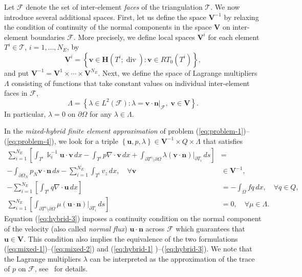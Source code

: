 Let $\mathcal{F}$ denote the set of inter-element \emph{faces} of the
triangulation $\mathcal{T}$. We now introduce several additional spaces.
First, let us define the space $\mathbf{V}^{-1}$ by relaxing the condition of
continuity of the normal components in the space $\mathbf{V}$ on inter-element
boundaries $\mathcal{F}$. More precisely, we define local spaces
$\mathbf{V}^{i}$ for each element $T^{i}\in\mathcal{T}$, $i=1,\ldots,N_{E}$,
by
\begin{equation}
\mathbf{V}^{i}=\left\{  \mathbf{v}\in\mathbf{H}(T^{i};\operatorname{div}%
):\mathbf{v}\in RT_{0}(T^{i})\right\}  ,
\end{equation}
and put $\mathbf{V}^{-1}=\mathbf{V}^{1}\times\cdots\times\mathbf{V}^{N_{E}}$.
Next, we define the space of Lagrange multipliers $\Lambda$ consisting of
functions that take constant values on individual inter-element faces in
$\mathcal{F}$,
\begin{equation}
\Lambda=\left\{  \lambda\in L^{2}\left(  \mathcal{F}\right)  :\lambda
=\mathbf{v}\cdot\mathbf{n}|_{\mathcal{F}},\;\mathbf{v\in V} \right\}.
\label{eq:lambda_space}
\end{equation}
In particular, $\lambda=0$ on $\partial\Omega$ for any $\lambda\in\Lambda$.


In the \emph{mixed-hybrid finite element approximation} of problem
(\ref{eq:problem-1})--(\ref{eq:problem-4}), we look for a triple $\left\{
\mathbf{u},p,\lambda\right\}  \in\mathbf{V}^{-1}\times Q\times\Lambda$ that
satisfies
\begin{align}
\sum_{i=1}^{N_{E}}\left[  \int_{T^{i}}\Bbbk_{i}^{-1}\mathbf{u}\cdot
\mathbf{v}\,dx-\int_{T^{i}}p\nabla\cdot\mathbf{v}\,dx+\int_{\partial
T^{i}\setminus\partial\Omega}\lambda(\mathbf{v}\cdot\mathbf{n})|_{\partial
T_{i}}\,ds\right]   &  =\label{eq:hybrid-1}\\
-\int_{\partial\Omega_{N}}p_{N}\mathbf{v}\cdot\mathbf{n}\,ds-\sum_{i=1}%
^{N_{E}}\int_{T^{i}}v_{z}\,dx,\quad\forall\mathbf{v}  &  \in\mathbf{V}^{-1}%
,\nonumber\\
-\sum_{i=1}^{N_{E}}\left[  \int_{T^{i}}q\nabla\cdot\mathbf{u}\,dx\right]   &
=-\int_{\Omega}fq\,dx,\quad\forall q\in Q,\label{eq:hybrid-2}\\
\sum_{i=1}^{N_{E}}\left[  \int_{\partial T^{i}\setminus\partial\Omega}%
\mu(\mathbf{u}\cdot\mathbf{n})|_{\partial T_{i}}\,ds\right]   &
=0,\quad\forall\mu\in\Lambda. \label{eq:hybrid-3}%
\end{align}
Equation (\ref{eq:hybrid-3}) imposes a continuity condition on the normal
component of the velocity (also called \emph{normal flux}) $\mathbf{u}\cdot\mathbf{n}$ across $\mathcal{F}$ which guarantees that
$\mathbf{u}\in\mathbf{V}$. This condition also implies the equivalence of the
two formulations (\ref{eq:mixed-1})--(\ref{eq:mixed-2}) and (\ref{eq:hybrid-1}%
)--(\ref{eq:hybrid-3}). We note that the Lagrange multipliers $\lambda$ can be
interpreted as the approximation of the trace of $p$ on $\mathcal{F}$,
see~\cite{Cowsar-1995-BDD} for details.

